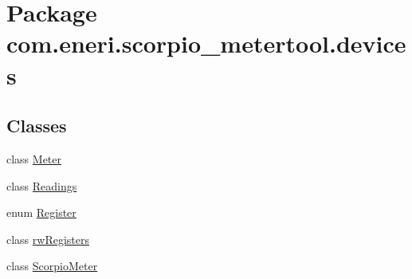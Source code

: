 \hypertarget{namespacecom_1_1eneri_1_1scorpio__metertool_1_1devices}{}\section{Package com.\+eneri.\+scorpio\+\_\+metertool.\+devices}
\label{namespacecom_1_1eneri_1_1scorpio__metertool_1_1devices}
\subsection*{Classes}
\begin{DoxyCompactItemize}
\item 
class \hyperlink{classcom_1_1eneri_1_1scorpio__metertool_1_1devices_1_1_meter}{Meter}
\item 
class \hyperlink{classcom_1_1eneri_1_1scorpio__metertool_1_1devices_1_1_readings}{Readings}
\item 
enum \hyperlink{enumcom_1_1eneri_1_1scorpio__metertool_1_1devices_1_1_register}{Register}
\item 
class \hyperlink{classcom_1_1eneri_1_1scorpio__metertool_1_1devices_1_1rw_registers}{rw\+Registers}
\item 
class \hyperlink{classcom_1_1eneri_1_1scorpio__metertool_1_1devices_1_1_scorpio_meter}{Scorpio\+Meter}
\end{DoxyCompactItemize}
